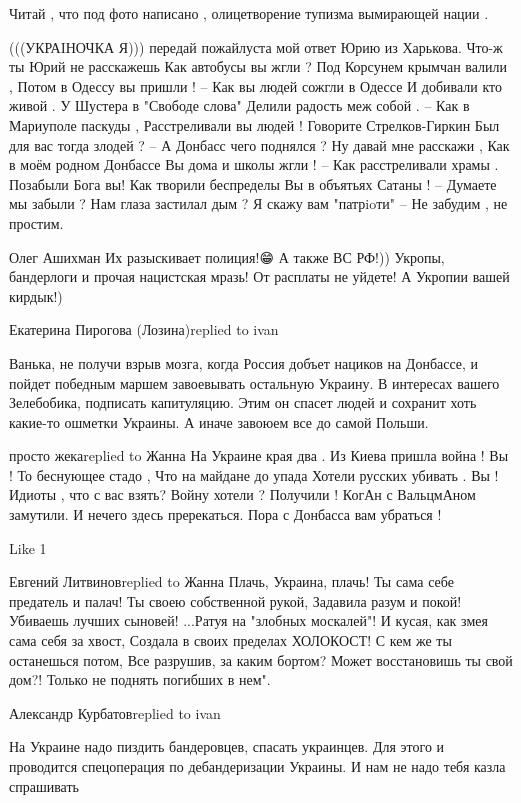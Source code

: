 Читай , что под фото написано , олицетворение тупизма вымирающей нации .

(((УКРАIНОЧКА Я))) передай пожайлуста мой ответ Юрию из Харькова.
Что-ж ты Юрий не расскажешь
Как автобусы вы жгли ?
Под Корсунем крымчан валили ,
Потом в Одессу вы пришли !
--
Как вы людей сожгли в Одессе
И добивали кто живой .
У Шустера в "Свободе слова"
Делили радость меж собой .
--
Как в Мариуполе паскуды ,
Расстреливали вы людей !
Говорите Стрелков-Гиркин
Был для вас тогда злодей ?
--
А Донбасс чего поднялся ?
Ну давай мне расскажи ,
Как в моём родном Донбассе
Вы дома и школы жгли !
--
Как расстреливали храмы .
Позабыли Бога вы!
Как творили беспределы
Вы в объятьях Сатаны !
--
Думаете мы забыли ?
Нам глаза застилал дым ?
Я скажу вам "патрioти" --
Не забудим , не простим.

Олег Ашихман
Их разыскивает полиция!😁 А также ВС РФ!)) Укропы, бандерлоги и прочая нацистская мразь! От расплаты не уйдете! А Укропии вашей кирдык!)

Екатерина Пирогова (Лозина)replied to ivan

Ванька, не получи взрыв мозга, когда Россия добъет нациков на Донбассе, и
пойдет победным маршем завоевывать остальную Украину. В интересах вашего
Зелебобика, подписать капитуляцию. Этим он спасет людей и сохранит хоть
какие-то ошметки Украины. А иначе завоюем все до самой Польши.

просто жекаreplied to Жанна
На Украине края два .
Из Киева пришла война !
Вы ! То беснующее стадо ,
Что на майдане до упада
Хотели русских убивать .
Вы ! Идиоты , что с вас взять?
Войну хотели ? Получили !
КогАн с ВальцмАном замутили.
И нечего здесь пререкаться.
Пора с Донбасса вам убраться !

    Like 1

Евгений Литвиновreplied to Жанна
Плачь, Украина, плачь!
Ты сама себе предатель и палач!
Ты своею собственной рукой,
Задавила разум и покой!
Убиваешь лучших сыновей!
...Ратуя на "злобных москалей"!
И кусая, как змея сама себя за хвост,
Создала в своих пределах ХОЛОКОСТ!
С кем же ты останешься потом,
Все разрушив, за каким бортом?
Может восстановишь ты свой дом?!
Только не поднять погибших в нем".

Александр Курбатовreplied to ivan

На Украине надо пиздить бандеровцев, спасать украинцев. Для этого и проводится
спецоперация по дебандеризации Украины. И нам не надо тебя казла спрашивать

